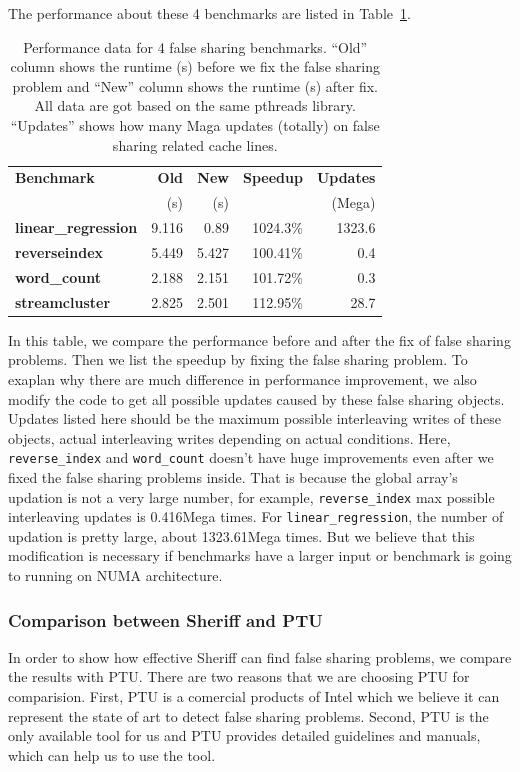 The performance about these 4 benchmarks are listed in Table~\ref{table:perfafterfix}. 
\begin{table}
\centering
\begin{tabular}{|l|r|r|r|r|}
\hline
{\bf \small Benchmark} & {\bf \small Old} & {\bf \small New} & {\bf \small Speedup} & {\bf \small Updates}\\
& (s) & (s) & &(Mega)\\
\hline
\small \textbf{linear\_regression} & 9.116 & 0.89 & 1024.3\% & 1323.6\\
\small \textbf{reverseindex} & 5.449 & 5.427  & 100.41\% & 0.4\\
\small \textbf{word\_count} & 2.188 & 2.151 & 101.72\% & 0.3\\
\small \textbf{streamcluster} & 2.825 & 2.501 & 112.95\% & 28.7\\
\hline
\end{tabular}
\caption{Performance data for 4 false sharing benchmarks. 
``Old'' column shows the runtime (s) before we fix the false sharing problem 
and ``New'' column shows the runtime (s) after fix. 
All data are got based on the same pthreads library. 
``Updates'' shows how many Maga updates (totally) on false sharing related cache lines. 
\label{table:perfafterfix}}
\end{table}

In this table, we compare the performance before and after the fix of false sharing problems.
Then we list the speedup by fixing the false sharing problem. 
To exaplan why there are much difference in performance improvement, we also 
modify the code to get all possible updates caused by these false sharing objects. 
Updates listed here should be the maximum possible interleaving writes of these objects, actual 
interleaving writes depending on actual conditions. 
Here, \texttt{reverse\_index} and \texttt{word\_count} doesn't have huge improvements even after we fixed 
the false sharing problems inside. That is because the global array's updation is 
not a very large number, for example, \texttt{reverse\_index} max possible interleaving updates is 0.416Mega times.
For \texttt{linear\_regression}, the number of updation is pretty large, about 1323.61Mega times. 
But we believe that this modification is necessary if benchmarks have a larger input or benchmark is 
going to running on NUMA architecture.

\subsubsection{Comparison between Sheriff and PTU}
\label{evaluation:comparison}
In order to show how effective Sheriff can find false sharing problems, we compare the results with PTU.
There are two reasons that we are choosing PTU for comparision. 
First, PTU is a comercial products of Intel which we believe it can represent the state of art to detect
false sharing problems.
Second, PTU is the only available tool for us and PTU provides detailed guidelines and manuals,
which can help us to use the tool.

